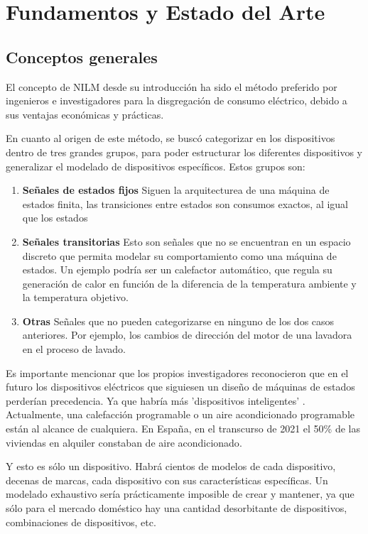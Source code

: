\chapter{Fundamentos y Estado del Arte}
\label{ch:fundamentos}

\section{Conceptos generales}
\label{se:ConceptosGeneralesa}

El concepto de NILM desde su introducción ha sido el método preferido por ingenieros e investigadores para la disgregación de consumo eléctrico, debido a sus ventajas económicas y prácticas.\autocite[pág. 2, pár. 4]{Nalmpantis2019}

En cuanto al origen de este método, se buscó categorizar en \autocite{192069} los dispositivos dentro de tres grandes grupos, para poder estructurar los diferentes dispositivos y generalizar el modelado de dispositivos específicos. 
Estos grupos son: 

\begin{enumerate}
\item \textbf{Señales de estados fijos} Siguen la arquitecturea de una máquina de estados finita, las transiciones entre estados son consumos exactos, al igual que los estados
\item \textbf{Señales transitorias} Esto son señales que no se encuentran en un espacio discreto que permita modelar su comportamiento como una máquina de estados. Un ejemplo podría ser un calefactor automático, que regula su generación de calor en función de la diferencia de la temperatura ambiente y la temperatura objetivo.
\item \textbf{Otras} Señales que no pueden categorizarse en ninguno de los dos casos anteriores. Por ejemplo, los cambios de dirección del motor de una lavadora en el proceso de lavado. 
\end{enumerate}

Es importante mencionar que los propios investigadores reconocieron que en el futuro los dispositivos eléctricos que siguiesen un diseño de máquinas de estados perderían precedencia. Ya que habría más 'dispositivos inteligentes' \autocite{192069}. Actualmente, una calefacción programable o un aire acondicionado programable están al alcance de cualquiera.
En España, en el transcurso de 2021 el 50\% de las viviendas en alquiler constaban de aire acondicionado\autocite{idealista2021}. 

Y esto es sólo un dispositivo. Habrá cientos de modelos de cada dispositivo, decenas de marcas, cada dispositivo con sus características específicas. 
Un modelado exhaustivo sería prácticamente imposible de crear y mantener, ya que sólo para el mercado doméstico hay una cantidad desorbitante de dispositivos, combinaciones de dispositivos, etc.

